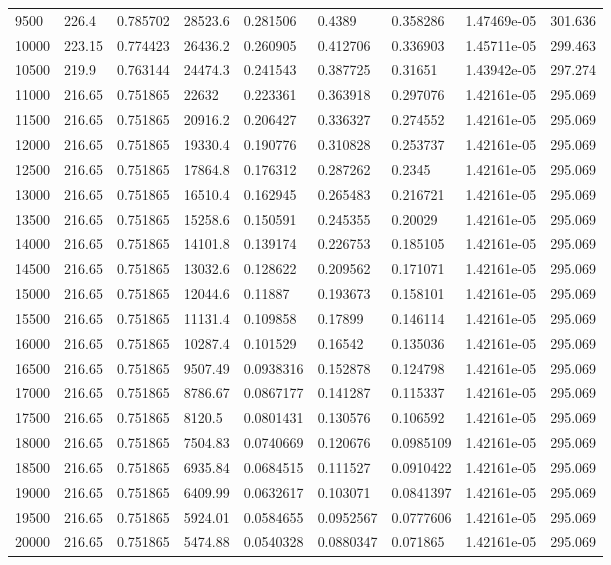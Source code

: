 \begin{tabular}{lllllllll}
9500 & 226.4 & 0.785702 & 28523.6 & 0.281506 & 0.4389 & 0.358286 & 1.47469e-05 & 301.636 \\
10000 & 223.15 & 0.774423 & 26436.2 & 0.260905 & 0.412706 & 0.336903 & 1.45711e-05 & 299.463 \\
10500 & 219.9 & 0.763144 & 24474.3 & 0.241543 & 0.387725 & 0.31651 & 1.43942e-05 & 297.274 \\
11000 & 216.65 & 0.751865 & 22632 & 0.223361 & 0.363918 & 0.297076 & 1.42161e-05 & 295.069 \\
11500 & 216.65 & 0.751865 & 20916.2 & 0.206427 & 0.336327 & 0.274552 & 1.42161e-05 & 295.069 \\
12000 & 216.65 & 0.751865 & 19330.4 & 0.190776 & 0.310828 & 0.253737 & 1.42161e-05 & 295.069 \\
12500 & 216.65 & 0.751865 & 17864.8 & 0.176312 & 0.287262 & 0.2345 & 1.42161e-05 & 295.069 \\
13000 & 216.65 & 0.751865 & 16510.4 & 0.162945 & 0.265483 & 0.216721 & 1.42161e-05 & 295.069 \\
13500 & 216.65 & 0.751865 & 15258.6 & 0.150591 & 0.245355 & 0.20029 & 1.42161e-05 & 295.069 \\
14000 & 216.65 & 0.751865 & 14101.8 & 0.139174 & 0.226753 & 0.185105 & 1.42161e-05 & 295.069 \\
14500 & 216.65 & 0.751865 & 13032.6 & 0.128622 & 0.209562 & 0.171071 & 1.42161e-05 & 295.069 \\
15000 & 216.65 & 0.751865 & 12044.6 & 0.11887 & 0.193673 & 0.158101 & 1.42161e-05 & 295.069 \\
15500 & 216.65 & 0.751865 & 11131.4 & 0.109858 & 0.17899 & 0.146114 & 1.42161e-05 & 295.069 \\
16000 & 216.65 & 0.751865 & 10287.4 & 0.101529 & 0.16542 & 0.135036 & 1.42161e-05 & 295.069 \\
16500 & 216.65 & 0.751865 & 9507.49 & 0.0938316 & 0.152878 & 0.124798 & 1.42161e-05 & 295.069 \\
17000 & 216.65 & 0.751865 & 8786.67 & 0.0867177 & 0.141287 & 0.115337 & 1.42161e-05 & 295.069 \\
17500 & 216.65 & 0.751865 & 8120.5 & 0.0801431 & 0.130576 & 0.106592 & 1.42161e-05 & 295.069 \\
18000 & 216.65 & 0.751865 & 7504.83 & 0.0740669 & 0.120676 & 0.0985109 & 1.42161e-05 & 295.069 \\
18500 & 216.65 & 0.751865 & 6935.84 & 0.0684515 & 0.111527 & 0.0910422 & 1.42161e-05 & 295.069 \\
19000 & 216.65 & 0.751865 & 6409.99 & 0.0632617 & 0.103071 & 0.0841397 & 1.42161e-05 & 295.069 \\
19500 & 216.65 & 0.751865 & 5924.01 & 0.0584655 & 0.0952567 & 0.0777606 & 1.42161e-05 & 295.069 \\
20000 & 216.65 & 0.751865 & 5474.88 & 0.0540328 & 0.0880347 & 0.071865 & 1.42161e-05 & 295.069 \\
\hline
\end{tabular}